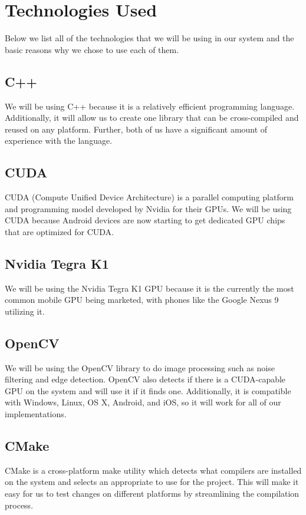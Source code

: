 \chapter{Technologies Used}
\label{technologies}

Below we list all of the technologies that we will be using in our system and the basic reasons why we chose to use each of them.

\section{C++}

We will be using C++ because it is a relatively efficient programming language. Additionally, it will allow us to create one library that can be cross-compiled and reused on any platform. Further, both of us have a significant amount of experience with the language.

\section{CUDA}

CUDA (Compute Unified Device Architecture) is a parallel computing platform and programming model developed by Nvidia for their GPUs. We will be using CUDA because Android devices are now starting to get dedicated GPU chips that are optimized for CUDA.

\section{Nvidia Tegra K1}

We will be using the Nvidia Tegra K1 GPU because it is the currently the most common mobile GPU being marketed, with phones like the Google Nexus 9 utilizing it.

\section{OpenCV}

We will be using the OpenCV library to do image processing such as noise filtering and edge detection. 
OpenCV also detects if there is a CUDA-capable GPU on the system and will use it if it finds one.
Additionally, it is compatible with Windows, Linux, OS X, Android, and iOS, so it will work for all of our implementations.

\section{CMake}

CMake is a cross-platform make utility which detects what compilers are installed on the system and selects an appropriate to use for the project. This will make it easy for us to test changes on different platforms by streamlining the compilation process.